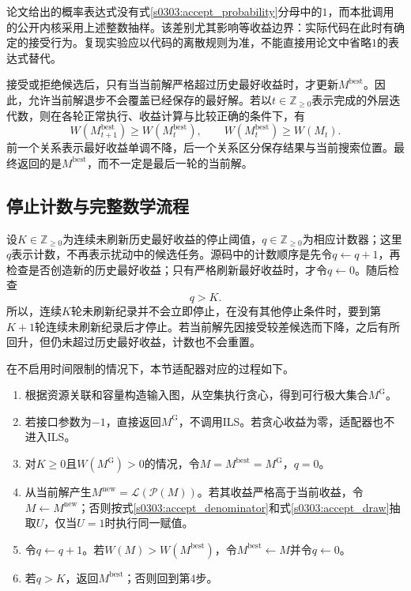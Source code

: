 论文给出的概率表达式没有式\eqref{s0303:accept_probability}分母中的$1$，而本批调用的公开内核采用上述整数抽样。该差别尤其影响等收益边界：实际代码在此时有确定的接受行为。复现实验应以代码的离散规则为准，不能直接用论文中省略$1$的表达式替代。

接受或拒绝候选后，只有当当前解严格超过历史最好收益时，才更新$M^{\mathrm{best}}$。因此，允许当前解退步不会覆盖已经保存的最好解。若以$t\in\mathbb{Z}_{\geq0}$表示完成的外层迭代数，则在各轮正常执行、收益计算与比较正确的条件下，有
\begin{equation}
 W(M^{\mathrm{best}}_{t+1})\geq W(M^{\mathrm{best}}_t),
 \qquad
 W(M^{\mathrm{best}}_t)\geq W(M_t).
 \label{s0303:best_invariants}
\end{equation}
前一个关系表示最好收益单调不降，后一个关系区分保存结果与当前搜索位置。最终返回的是$M^{\mathrm{best}}$，而不一定是最后一轮的当前解。

\subsection{停止计数与完整数学流程}

设$K\in\mathbb{Z}_{\geq0}$为连续未刷新历史最好收益的停止阈值，$q\in\mathbb{Z}_{\geq0}$为相应计数器；这里$q$表示计数，不再表示扰动中的候选任务。源码中的计数顺序是先令$q\leftarrow q+1$，再检查是否创造新的历史最好收益；只有严格刷新最好收益时，才令$q\leftarrow0$。随后检查
\begin{equation}
 q>K.
 \label{s0303:stop}
\end{equation}
所以，连续$K$轮未刷新纪录并不会立即停止，在没有其他停止条件时，要到第$K+1$轮连续未刷新纪录后才停止。若当前解先因接受较差候选而下降，之后有所回升，但仍未超过历史最好收益，计数也不会重置。

在不启用时间限制的情况下，本节适配器对应的过程如下。
\begin{enumerate}
 \item 根据资源关联和容量构造输入图，从空集执行贪心，得到可行极大集合$M^{\mathrm{G}}$。
 \item 若接口参数为$-1$，直接返回$M^{\mathrm{G}}$，不调用ILS。若贪心收益为零，适配器也不进入ILS。
 \item 对$K\geq0$且$W(M^{\mathrm{G}})>0$的情况，令$M=M^{\mathrm{best}}=M^{\mathrm{G}}$，$q=0$。
 \item 从当前解产生$M^{\mathrm{new}}=\mathcal{L}(\mathcal{P}(M))$。若其收益严格高于当前收益，令$M\leftarrow M^{\mathrm{new}}$；否则按式\eqref{s0303:accept_denominator}和式\eqref{s0303:accept_draw}抽取$U$，仅当$U=1$时执行同一赋值。
 \item 令$q\leftarrow q+1$。若$W(M)>W(M^{\mathrm{best}})$，令$M^{\mathrm{best}}\leftarrow M$并令$q\leftarrow0$。
 \item 若$q>K$，返回$M^{\mathrm{best}}$；否则回到第4步。
\end{enumerate}

